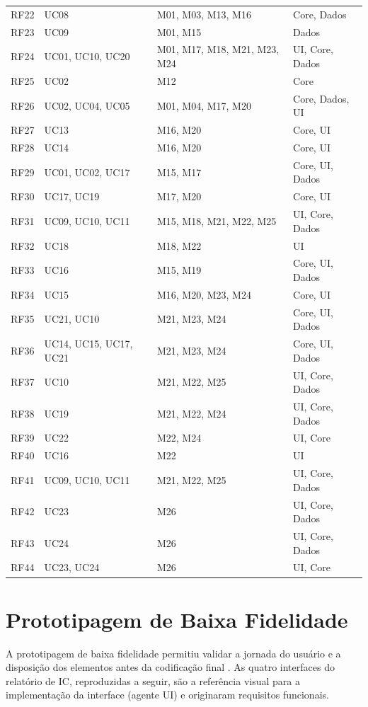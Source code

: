 \begin{longtable}{@{}L{1.4cm}L{2.5cm}L{3.8cm}L{3.0cm}@{}}
RF22 & UC08 & M01, M03, M13, M16 & Core, Dados\\
RF23 & UC09 & M01, M15 & Dados\\
RF24 & UC01, UC10, UC20 & M01, M17, M18, M21, M23, M24 & UI, Core, Dados\\
RF25 & UC02 & M12 & Core\\
RF26 & UC02, UC04, UC05 & M01, M04, M17, M20 & Core, Dados, UI\\
RF27 & UC13 & M16, M20 & Core, UI\\
RF28 & UC14 & M16, M20 & Core, UI\\
RF29 & UC01, UC02, UC17 & M15, M17 & Core, UI, Dados\\
RF30 & UC17, UC19 & M17, M20 & Core, UI\\
RF31 & UC09, UC10, UC11 & M15, M18, M21, M22, M25 & UI, Core, Dados\\
RF32 & UC18 & M18, M22 & UI\\
RF33 & UC16 & M15, M19 & Core, UI, Dados\\
RF34 & UC15 & M16, M20, M23, M24 & Core, UI\\
RF35 & UC21, UC10 & M21, M23, M24 & Core, UI, Dados\\
RF36 & UC14, UC15, UC17, UC21 & M21, M23, M24 & Core, UI, Dados\\
RF37 & UC10 & M21, M22, M25 & UI, Core, Dados\\
RF38 & UC19 & M21, M22, M24 & UI, Core, Dados\\
RF39 & UC22 & M22, M24 & UI, Core\\
RF40 & UC16 & M22 & UI\\
RF41 & UC09, UC10, UC11 & M21, M22, M25 & UI, Core, Dados\\
RF42 & UC23 & M26 & UI, Core, Dados\\
RF43 & UC24 & M26 & UI, Core, Dados\\
RF44 & UC23, UC24 & M26 & UI, Core\\
\end{longtable}

\section{Prototipagem de Baixa Fidelidade}\label{sec:prototipagem}

A prototipagem de baixa fidelidade permitiu validar a jornada do usuário e a disposição dos elementos antes da codificação final \cite{reis2026ic}. As quatro interfaces do relatório de IC, reproduzidas a seguir, são a referência visual para a implementação da interface (agente UI) e originaram requisitos funcionais.

